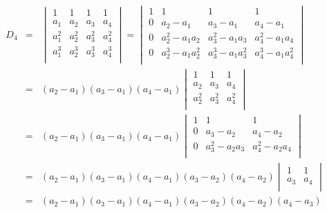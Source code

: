\documentclass[
]{article}
\begin{document}
\[\begin{matrix}
D_{4} & = & \begin{vmatrix}
1 & 1 & 1 & 1 \\
a_{1} & a_{2} & a_{3} & a_{4} \\
a_{1}^{2} & a_{2}^{2} & a_{3}^{2} & a_{4}^{2} \\
a_{1}^{3} & a_{2}^{3} & a_{3}^{3} & a_{4}^{3} \\
\end{vmatrix} = \begin{vmatrix}
1 & 1 & 1 & 1 \\
0 & a_{2} - a_{1} & a_{3} - a_{1} & a_{4} - a_{1} \\
0 & a_{2}^{2} - a_{1}a_{2} & a_{3}^{2} - a_{1}a_{3} & a_{4}^{2} - a_{1}a_{4} \\
0 & a_{2}^{3} - a_{1}a_{2}^{2} & a_{3}^{3} - a_{1}a_{3}^{2} & a_{4}^{3} - a_{1}a_{4}^{2} \\
\end{vmatrix} \\
 & = & (a_{2} - a_{1})(a_{3} - a_{1})(a_{4} - a_{1})\begin{vmatrix}
1 & 1 & 1 \\
a_{2} & a_{3} & a_{4} \\
a_{2}^{2} & a_{3}^{2} & a_{4}^{2} \\
\end{vmatrix} \\
 & = & (a_{2} - a_{1})(a_{3} - a_{1})(a_{4} - a_{1})\begin{vmatrix}
1 & 1 & 1 \\
0 & a_{3} - a_{2} & a_{4} - a_{2} \\
0 & a_{3}^{2} - a_{2}a_{3} & a_{4}^{2} - a_{2}a_{4} \\
\end{vmatrix} \\
 & = & (a_{2} - a_{1})(a_{3} - a_{1})(a_{4} - a_{1})(a_{3} - a_{2})(a_{4} - a_{2})\begin{vmatrix}
1 & 1 \\
a_{3} & a_{4} \\
\end{vmatrix} \\
 & = & (a_{2} - a_{1})(a_{3} - a_{1})(a_{4} - a_{1})(a_{3} - a_{2})(a_{4} - a_{2})(a_{4} - a_{3}) \\
\end{matrix}\]
\end{document}
